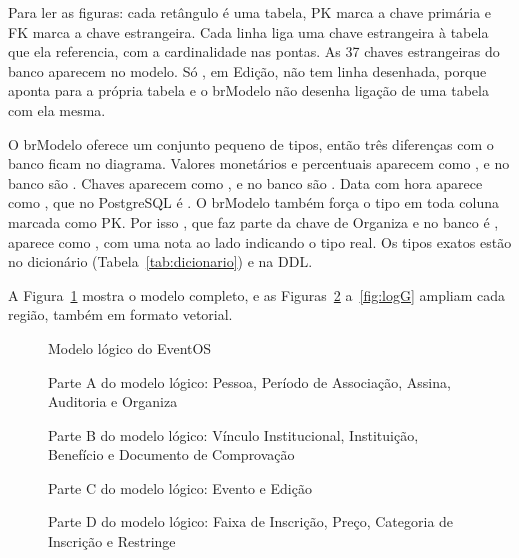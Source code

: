 Para ler as figuras: cada retângulo é uma tabela, PK marca a chave primária e FK marca a chave estrangeira. Cada linha liga uma chave estrangeira à tabela que ela referencia, com a cardinalidade nas pontas. As 37 chaves estrangeiras do banco aparecem no modelo. Só , em Edição, não tem linha desenhada, porque aponta para a própria tabela e o brModelo não desenha ligação de uma tabela com ela mesma.

O brModelo oferece um conjunto pequeno de tipos, então três diferenças com o banco ficam no diagrama. Valores monetários e percentuais aparecem como , e no banco são . Chaves aparecem como , e no banco são . Data com hora aparece como , que no PostgreSQL é . O brModelo também força o tipo  em toda coluna marcada como PK. Por isso , que faz parte da chave de Organiza e no banco é , aparece como , com uma nota ao lado indicando o tipo real. Os tipos exatos estão no dicionário (Tabela~\ref{tab:dicionario}) e na DDL.

A Figura~\ref{fig:loggeral} mostra o modelo completo, e as Figuras~\ref{fig:logA} a~\ref{fig:logG} ampliam cada região, também em formato vetorial.

\begin{landscape}
\begin{figure}[p]
\centering
\loggeral
\caption{Modelo lógico do EventOS}
\label{fig:loggeral}
\end{figure}
\end{landscape}

\begin{figure}[h!]
\centering
\logA
\caption{Parte A do modelo lógico: Pessoa, Período de Associação, Assina, Auditoria e Organiza}
\label{fig:logA}
\end{figure}

\begin{figure}[h!]
\centering
\logB
\caption{Parte B do modelo lógico: Vínculo Institucional, Instituição, Benefício e Documento de Comprovação}
\label{fig:logB}
\end{figure}

\begin{figure}[h!]
\centering
\logC
\caption{Parte C do modelo lógico: Evento e Edição}
\label{fig:logC}
\end{figure}

\begin{figure}[h!]
\centering
\logD
\caption{Parte D do modelo lógico: Faixa de Inscrição, Preço, Categoria de Inscrição e Restringe}
\label{fig:logD}
\end{figure}


